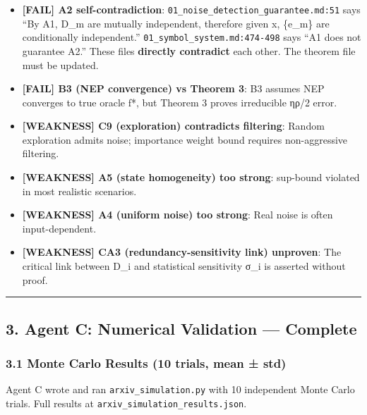 \documentclass[
  12pt,
]{ctexart}
\providecommand{\tightlist}{%
  \setlength{\itemsep}{0pt}\setlength{\parskip}{0pt}}
\begin{document}
\begin{itemize}
\tightlist
\item
  \textbf{{[}FAIL{]} A2 self-contradiction}:
  \texttt{01\_noise\_detection\_guarantee.md:51} says ``By A1, D\_m are
  mutually independent, therefore given x, \{e\_m\} are conditionally
  independent.'' \texttt{01\_symbol\_system.md:474-498} says ``A1 does
  not guarantee A2.'' These files \textbf{directly contradict} each
  other. The theorem file must be updated.
\item
  \textbf{{[}FAIL{]} B3 (NEP convergence) vs Theorem 3}: B3 assumes NEP
  converges to true oracle f*, but Theorem 3 proves irreducible ηρ/2
  error.
\item
  \textbf{{[}WEAKNESS{]} C9 (exploration) contradicts filtering}: Random
  exploration admits noise; importance weight bound requires
  non-aggressive filtering.
\item
  \textbf{{[}WEAKNESS{]} A5 (state homogeneity) too strong}: sup-bound
  violated in most realistic scenarios.
\item
  \textbf{{[}WEAKNESS{]} A4 (uniform noise) too strong}: Real noise is
  often input-dependent.
\item
  \textbf{{[}WEAKNESS{]} CA3 (redundancy-sensitivity link) unproven}:
  The critical link between D\_i and statistical sensitivity σ\_i is
  asserted without proof.
\end{itemize}

\begin{center}\rule{0.5\linewidth}{0.5pt}\end{center}

\subsection{3. Agent C: Numerical Validation ---
Complete}\label{agent-c-numerical-validation-complete}

\subsubsection{3.1 Monte Carlo Results (10 trials, mean ±
std)}\label{monte-carlo-results-10-trials-mean-std}

Agent C wrote and ran \texttt{arxiv\_simulation.py} with 10 independent
Monte Carlo trials. Full results at
\texttt{arxiv\_simulation\_results.json}.
\end{document}
